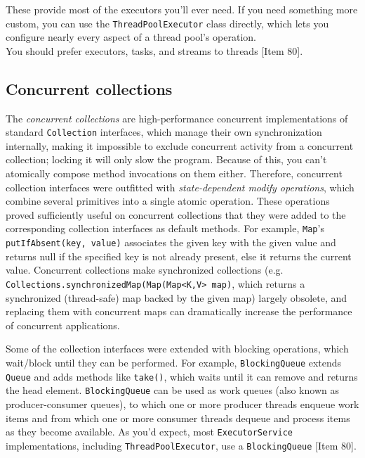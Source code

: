 \documentclass[table, xcdraw]{article}%
\begin{document}
These provide most of the executors you’ll ever need. If you need something more custom, you can use the \texttt{ThreadPoolExecutor} class directly, which lets you configure nearly every aspect of a thread pool’s operation.\\
You should prefer executors, tasks, and streams to threads [Item 80].

\subsection{Concurrent collections}

The \emph{concurrent collections} are high-performance concurrent implementations of standard \texttt{Collection} interfaces, which manage their own synchronization internally, making it impossible to exclude concurrent activity from a concurrent collection; locking it will only slow the program. Because of this, you can’t atomically compose method invocations on them either. Therefore, concurrent collection interfaces were outfitted with \emph{state-dependent modify operations}, which combine several primitives into a single atomic operation. These operations proved sufficiently useful on concurrent collections that they were added to the corresponding collection interfaces as default methods. For example, \texttt{Map}’s \texttt{putIfAbsent(key, value)} associates the given key with the given value and returns null if the specified key is not already present, else it returns the current value. Concurrent collections make synchronized collections (e.g. \texttt{Collections.synchronizedMap(Map(Map<K,V> map)}, which returns a synchronized (thread-safe) map backed by the given map) largely obsolete, and replacing them with concurrent maps can dramatically increase the performance of concurrent applications.

Some of the collection interfaces were extended with blocking operations, which wait/block until they can be performed. For example, \texttt{BlockingQueue} extends \texttt{Queue} and adds methods like \texttt{take()}, which waits until it can remove and returns the head element. \texttt{BlockingQueue} can be used as work queues (also known as producer-consumer queues), to which one or more producer threads enqueue work items and from which one or more consumer threads dequeue and process items as they become available. As you’d expect, most \texttt{ExecutorService} implementations, including \texttt{ThreadPoolExecutor}, use a \texttt{BlockingQueue} [Item 80].
\end{document}

